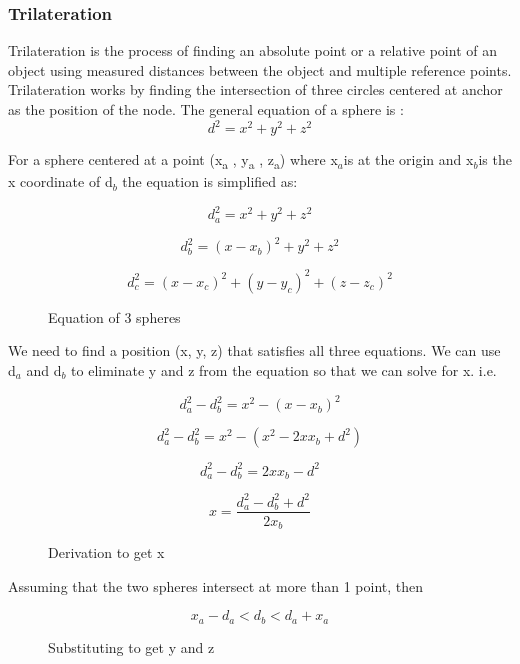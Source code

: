 \subsubsection{Trilateration}

Trilateration is the process of finding an absolute point or a relative
point of an object using measured distances between the object and
multiple reference points. Trilateration works by finding the intersection
of three circles centered at anchor as the position of the node. The
general equation of a sphere is :
\[
d^{2}=x^{2}+y^{2}+z^{2}
\]


For a sphere centered at a point (x\textsubscript{a} , y\textsubscript{a}
, z\textsubscript{a}) where x$_{a}$is at the origin and x$_{b}$is
the x coordinate of d$_{b}$ the equation is simplified as:

\begin{figure}[H]
\[
d_{a}^{2}=x^{2}+y^{2}+z^{2}
\]


\[
d_{b}^{2}=\left(x-x_{b}\right)^{2}+y^{2}+z^{2}
\]


\[
d_{c}^{2}=\left(x-x_{c}\right)^{2}+\left(y-y_{c}\right)^{2}+\left(z-z_{c}\right)^{2}
\]


\protect\caption{Equation of 3 spheres}


\end{figure}


We need to find a position (x, y, z) that satisfies all three equations.
We can use d$_{a}$ and d$_{b}$ to eliminate y and z from the equation
so that we can solve for x. i.e.

\begin{figure}[H]
\[
d_{a}^{2}-d_{b}^{2}=x^{2}-\left(x-x_{b}\right)^{2}
\]


\[
d_{a}^{2}-d_{b}^{2}=x^{2}-\left(x^{2}-2xx_{b}+d^{2}\right)
\]


\[
d_{a}^{2}-d_{b}^{2}=2xx_{b}-d^{2}
\]


\[
x=\frac{d_{a}^{2}-d_{b}^{2}+d^{2}}{2x_{b}}
\]


\protect\caption{Derivation to get x}
\end{figure}


Assuming that the two spheres intersect at more than 1 point, then 

\[
x_{a}-d_{a}<d_{b}<d_{a}+x_{a}
\]


\begin{figure}[H]
\protect\caption{Substituting to get y and z}


\end{figure}


